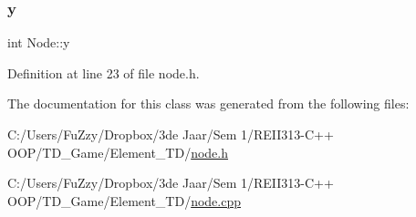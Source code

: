 \subsubsection{\texorpdfstring{y}{y}}
{\footnotesize\ttfamily int Node\+::y}



Definition at line 23 of file node.\+h.



The documentation for this class was generated from the following files\+:\begin{DoxyCompactItemize}
\item 
C\+:/\+Users/\+Fu\+Zzy/\+Dropbox/3de Jaar/\+Sem 1/\+R\+E\+I\+I313-\/\+C++ O\+O\+P/\+T\+D\+\_\+\+Game/\+Element\+\_\+\+T\+D/\hyperlink{node_8h}{node.\+h}\item 
C\+:/\+Users/\+Fu\+Zzy/\+Dropbox/3de Jaar/\+Sem 1/\+R\+E\+I\+I313-\/\+C++ O\+O\+P/\+T\+D\+\_\+\+Game/\+Element\+\_\+\+T\+D/\hyperlink{node_8cpp}{node.\+cpp}\end{DoxyCompactItemize}
